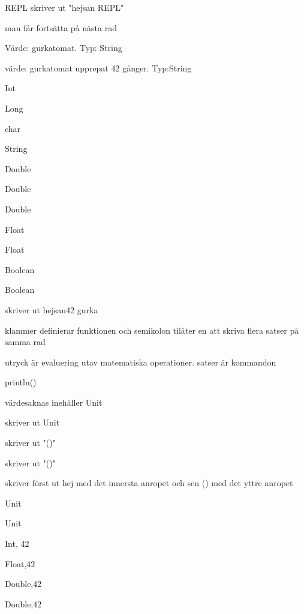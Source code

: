 
\ExerciseSolution{\ExeWeekONE}

\BasicTasks %

\Task %

\Subtask REPL skriver ut "hejsan REPL"

\Subtask man får fortsätta på nästa rad

\Subtask Värde: gurkatomat. Typ: String

\Subtask värde: gurkatomat upprepat 42 gånger. Typ:String

\Task %
 
\Task %

\Subtask Int

\Subtask Long

\Subtask char

\Subtask String

\Subtask Double

\Subtask Double

\Subtask Double

\Subtask Float

\Subtask Float

\Subtask Boolean

\Subtask Boolean


\Task %
 skriver ut hejsan42
gurka

 klammer definierar funktionen och semikolon tilåter en att skriva flera satser på samma rad

\Task %
\Subtask  utryck är evaluering utav matematiska operationer. satser är kommandon

\Subtask println()

\Subtask 

 värdesaknas inehåller Unit

 skriver ut Unit

 skriver ut "()"

 skriver ut "()"

 skriver först ut hej med det innersta anropet och sen () med det yttre anropet

\Subtask  Unit

\Subtask  Unit

\Task %

\Subtask  Int, 42

\Subtask Float,42

\Subtask Double,42

\Subtask Double,42

